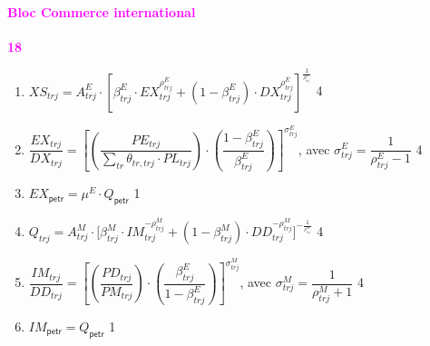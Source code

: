 \documentclass[11pt,a4paper]{article}
\newcommand{\petr}{\mathsf{petr}}
\newcommand{\tr}{\mathit{tr}}
\newcommand{\trj}{\mathit{trj}}
\newcommand{\DD}{\mathit{DD}}
\newcommand{\DX}{\mathit{DX}}
\newcommand{\EX}{\mathit{EX}}
\newcommand{\IM}{\mathit{IM}}
\newcommand{\PD}{\mathit{PD}}
\newcommand{\PE}{\mathit{PE}}
\newcommand{\PL}{\mathit{PL}}
\newcommand{\PM}{\mathit{PM}}
\newcommand{\XS}{\mathit{XS}}
\newcommand{\redparagraph}[1]{\paragraph*{\large\textcolor{Fuchsia}{#1}}}
\begin{document}
	
	\redparagraph{Bloc Commerce international}\hfill \textcolor{Fuchsia}{\textbf{18}}
	\begin{enumerate}[itemsep=2pt,label=\textbf{eq\arabic*}.,resume,  ref=\textbf{eq\arabic*}]
		
		\item $\XS_{\trj} = A_{\trj}^E \cdot \left[\beta_{\trj}^E\cdot\EX_{\trj}^{\rho_{\trj}^E} + \left(1 - \beta_{\trj}^E\right)\cdot \DX_{\trj}^{\rho_{\trj}^E}\right]^{\frac{1}{^{\rho_{\trj}^E}}}$ \hfill 4
		
		\item  $\dfrac{\EX_{\trj}}{\DX_{\trj}} = \left[\left(\dfrac{\PE_{\trj}}{\displaystyle\sum_{\tr}\theta_{\tr,\trj}\cdot\PL_{\trj}}\right)\cdot\left(\dfrac{1-\beta_{\trj}^E}{\beta_{\trj}^E}\right)\right]^{\sigma_{\trj}^E}$, avec $\sigma^E_{\trj} = \dfrac{1}{\rho_{\trj}^E-1}$  \label{it:EX} \hfill 4
		
		\item $\EX_{\petr} = \mu^{E}_{}\cdot Q_{\petr}$ \label{it:EXpetr}\hfill 1
		
		\item $Q_{\trj} = A_{\trj}^M \cdot \bigg[\beta_{\trj}^M\cdot\IM_{\trj}^{-\rho_{\trj}^M} + \left(1 - \beta_{\trj}^M\right)\cdot\DD_{\trj}^{-\rho_{\trj}^M}\bigg]^{-\frac{1}{^{\rho_{\trj}^M}}}$ \label{it:Q} \hfill 4 
				
		\item  $\dfrac{\IM_{\trj}}{\DD_{\trj}} = \left[\left(\dfrac{\PD_{\trj}}{\PM_{\trj}}\right)\cdot\left(\dfrac{\beta_{\trj}^E}{1-\beta_{\trj}^E}\right)\right]^{\sigma_{\trj}^M}$, avec $\sigma^M_{\trj} = \dfrac{1}{\rho_{\trj}^M+1}$ \label{it:IM}  \hfill 4
		
		\item $\IM_{\petr} = Q_{\petr}$ \hfill 1
				
	\end{enumerate}
	
\end{document}
